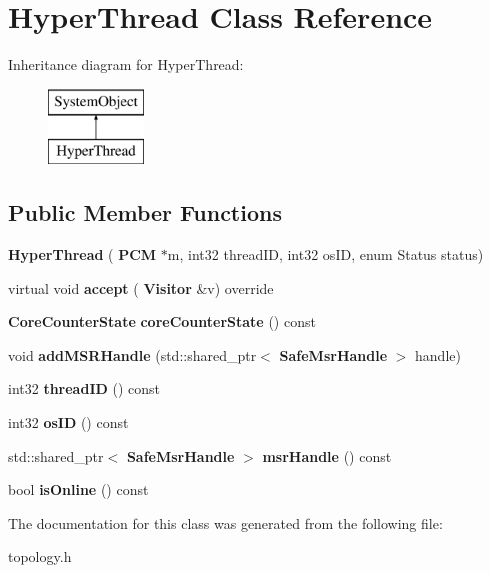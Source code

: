 \section{Hyper\+Thread Class Reference}
\label{classHyperThread}
Inheritance diagram for Hyper\+Thread\+:\begin{figure}[H]
\begin{center}
\leavevmode
\includegraphics[height=2.000000cm]{classHyperThread}
\end{center}
\end{figure}
\subsection*{Public Member Functions}
\begin{DoxyCompactItemize}
\item 
\mbox{\label{classHyperThread_aee2942dacc62b39038079a8f8e31db16}} 
{\bfseries Hyper\+Thread} (\textbf{ P\+CM} $\ast$m, int32 thread\+ID, int32 os\+ID, enum Status status)
\item 
\mbox{\label{classHyperThread_a9fe81f92fc61a081b5000eee017d6ed4}} 
virtual void {\bfseries accept} (\textbf{ Visitor} \&v) override
\item 
\mbox{\label{classHyperThread_a1ed47285554aca8de31c983fecc81eb5}} 
\textbf{ Core\+Counter\+State} {\bfseries core\+Counter\+State} () const
\item 
\mbox{\label{classHyperThread_ad6e0682350ba93df8195da266fb0259f}} 
void {\bfseries add\+M\+S\+R\+Handle} (std\+::shared\+\_\+ptr$<$ \textbf{ Safe\+Msr\+Handle} $>$ handle)
\item 
\mbox{\label{classHyperThread_ab36deb67366d332c59dc4c757525bdf6}} 
int32 {\bfseries thread\+ID} () const
\item 
\mbox{\label{classHyperThread_acd91aca6fd5636fc1e9a2ab12f9a8ab0}} 
int32 {\bfseries os\+ID} () const
\item 
\mbox{\label{classHyperThread_a0b3490a6e1cc7f50d9a2d83a8a31e8b5}} 
std\+::shared\+\_\+ptr$<$ \textbf{ Safe\+Msr\+Handle} $>$ {\bfseries msr\+Handle} () const
\item 
\mbox{\label{classHyperThread_a3758921cdc64706bc8ceb2de0f052a16}} 
bool {\bfseries is\+Online} () const
\end{DoxyCompactItemize}


The documentation for this class was generated from the following file\+:\begin{DoxyCompactItemize}
\item 
topology.\+h\end{DoxyCompactItemize}

